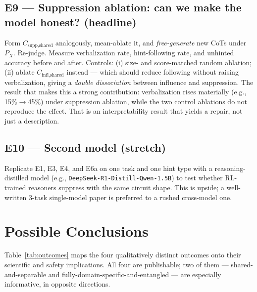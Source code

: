 \documentclass[11pt]{article}
\begin{document}
\subsection*{E9 --- Suppression ablation: can we make the model honest? (headline)}
Form $C_{\text{supp,shared}}$ analogously, mean-ablate it, and \emph{free-generate} new CoTs under $P_X$. Re-judge. Measure verbalization rate, hint-following rate, and unhinted accuracy before and after. Controls: (i) size- and score-matched random ablation; (ii) ablate $C_{\text{infl,shared}}$ instead --- which should reduce following without raising verbalization, giving a \emph{double dissociation} between influence and suppression. The result that makes this a strong contribution: verbalization rises materially (e.g., 15\%$\to$45\%) under suppression ablation, while the two control ablations do not reproduce the effect. That is an interpretability result that yields a repair, not just a description.

\subsection*{E10 --- Second model (stretch)}
Replicate E1, E3, E4, and E6a on one task and one hint type with a reasoning-distilled model (e.g., \texttt{DeepSeek-R1-Distill-Qwen-1.5B}) to test whether RL-trained reasoners suppress with the same circuit shape. This is upside; a well-written 3-task single-model paper is preferred to a rushed cross-model one.

\section{Possible Conclusions}
\label{sec:conclusions}

Table~\ref{tab:outcomes} maps the four qualitatively distinct outcomes onto their scientific and safety implications. All four are publishable; two of them --- shared-and-separable and fully-domain-specific-and-entangled --- are especially informative, in opposite directions.
\end{document}
